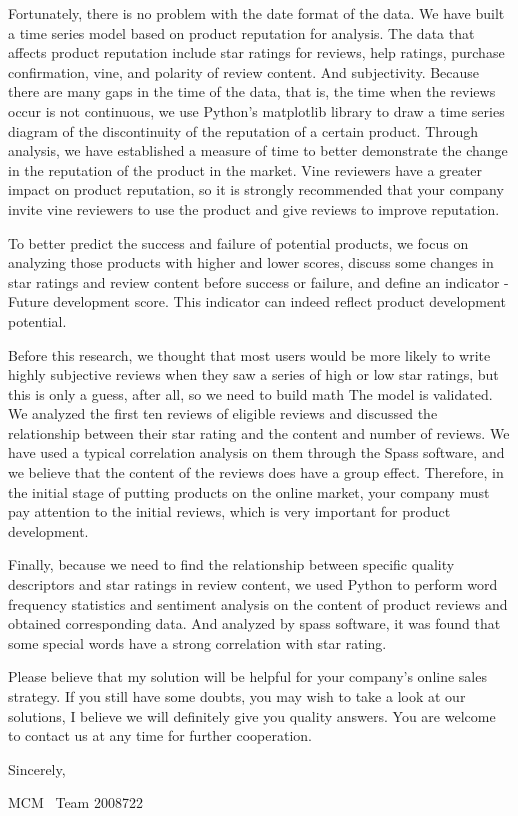 \documentclass{mcmthesis}
\begin{document}
\begin{memo}[Letter]
	Fortunately, there is no problem with the date format of the data. We have built a time series model based on product reputation for analysis. The data that affects product reputation include star ratings for reviews, help ratings, purchase confirmation, vine, and polarity of review content. And subjectivity.  Because there are many gaps in the time of the data, that is, the time when the reviews occur is not continuous, we use Python's matplotlib library to draw a time series diagram of the discontinuity of the reputation of a certain product. Through analysis, we have established a measure of time to better demonstrate the change in the reputation of the product in the market. Vine reviewers have a greater impact on product reputation, so it is strongly recommended that your company invite vine reviewers to use the product and give reviews to improve reputation.
	
	To better predict the success and failure of potential products, we focus on analyzing those products with higher and lower scores, discuss some changes in star ratings and review content before success or failure, and define an indicator -Future development score. This indicator can indeed reflect product development potential.
	
	Before this research, we thought that most users would be more likely to write highly subjective reviews when they saw a series of high or low star ratings, but this is only a guess, after all, so we need to build math The model is validated. We analyzed the first ten reviews of eligible reviews and discussed the relationship between their star rating and the content and number of reviews. We have used a typical correlation analysis on them through the Spass software, and we believe that the content of the reviews does have a group effect. Therefore, in the initial stage of putting products on the online market, your company must pay attention to the initial reviews, which is very important for product development.
	
	Finally, because we need to find the relationship between specific quality descriptors and star ratings in review content, we used Python to perform word frequency statistics and sentiment analysis on the content of product reviews and obtained corresponding data. And analyzed by spass software, it was found that some special words have a strong correlation with star rating.
	
	Please believe that my solution will be helpful for your company's online sales strategy. If you still have some doubts, you may wish to take a look at our solutions, I believe we will definitely give you quality answers.
	You are welcome to contact us at any time for further cooperation.
	
	Sincerely,
	
	MCM \ Team 2008722 
	
\end{memo}
\end{document}
